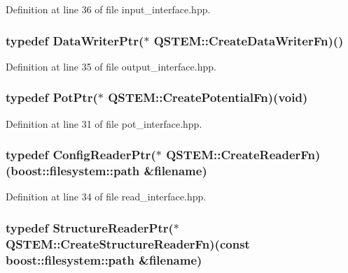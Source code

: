 Definition at line 36 of file input\-\_\-interface.\-hpp.

\hypertarget{namespace_q_s_t_e_m_aae795ff3e7acb0931b3dc001b547c004}{
\subsubsection[{Create\-Data\-Writer\-Fn}]{\setlength{\rightskip}{0pt plus 5cm}typedef {\bf Data\-Writer\-Ptr}($\ast$ Q\-S\-T\-E\-M\-::\-Create\-Data\-Writer\-Fn)()}}\label{namespace_q_s_t_e_m_aae795ff3e7acb0931b3dc001b547c004}


Definition at line 35 of file output\-\_\-interface.\-hpp.

\hypertarget{namespace_q_s_t_e_m_a3f54159e85da43c662b044e310591f3f}{
\subsubsection[{Create\-Potential\-Fn}]{\setlength{\rightskip}{0pt plus 5cm}typedef {\bf Pot\-Ptr}($\ast$ Q\-S\-T\-E\-M\-::\-Create\-Potential\-Fn)(void)}}\label{namespace_q_s_t_e_m_a3f54159e85da43c662b044e310591f3f}


Definition at line 31 of file pot\-\_\-interface.\-hpp.

\hypertarget{namespace_q_s_t_e_m_afe36827e976fd231943b40ce85533524}{
\subsubsection[{Create\-Reader\-Fn}]{\setlength{\rightskip}{0pt plus 5cm}typedef {\bf Config\-Reader\-Ptr}($\ast$ Q\-S\-T\-E\-M\-::\-Create\-Reader\-Fn)(boost\-::filesystem\-::path \&{\bf filename})}}\label{namespace_q_s_t_e_m_afe36827e976fd231943b40ce85533524}


Definition at line 34 of file read\-\_\-interface.\-hpp.

\hypertarget{namespace_q_s_t_e_m_a3bd4c40f6c26749ba931d19901e84255}{
\subsubsection[{Create\-Structure\-Reader\-Fn}]{\setlength{\rightskip}{0pt plus 5cm}typedef {\bf Structure\-Reader\-Ptr}($\ast$ Q\-S\-T\-E\-M\-::\-Create\-Structure\-Reader\-Fn)(const boost\-::filesystem\-::path \&{\bf filename})}}\label{namespace_q_s_t_e_m_a3bd4c40f6c26749ba931d19901e84255}


